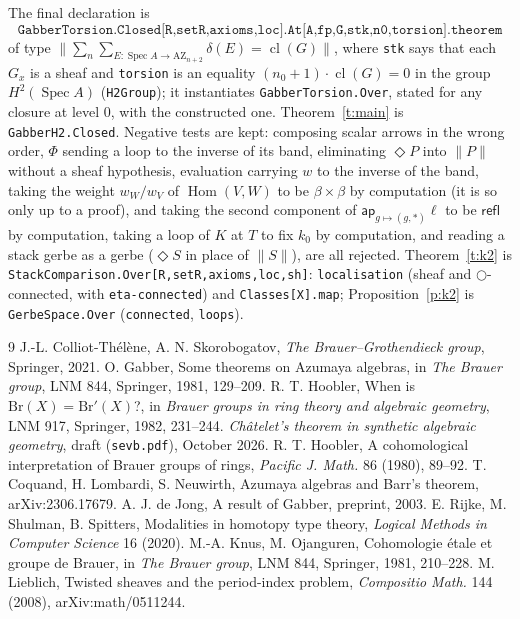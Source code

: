 \documentclass[11pt]{amsart}
\theoremstyle{definition}
\theoremstyle{remark}
\newcommand{\Spec}{\operatorname{Spec}}
\newcommand{\Hom}{\operatorname{Hom}}
\newcommand{\cl}{\operatorname{cl}}
\newcommand{\close}{\Diamond}
\newcommand{\tr}[1]{\|#1\|}
\newcommand{\code}[1]{\texttt{#1}}
\newcommand{\ap}{\mathsf{ap}}
\begin{document}
\smallskip
The final declaration is
\[\code{GabberTorsion.Closed[R,setR,axioms,loc].At[A,fp,G,stk,n0,torsion].theorem}\]
of type $\tr{\sum_n\sum_{E:\Spec A\to\mathrm{AZ}_{n+2}}\delta(E)=\cl(G)}$,
where \code{stk} says that each $G_x$ is a sheaf and \code{torsion} is an
equality $(n_0+1)\cdot\cl(G)=0$ in the group $H^2(\Spec A)$
(\code{H2Group}); it instantiates \code{GabberTorsion.Over}, stated for any
closure at level $0$, with the constructed one. Theorem~\ref{t:main} is
\code{GabberH2.Closed}. Negative tests are kept: composing scalar arrows in
the wrong order, $\Phi$ sending a loop to the inverse of its band,
eliminating $\close P$ into $\tr P$ without a sheaf hypothesis, evaluation
carrying $w$ to the inverse of the band, taking the weight
$w_W/w_V$ of $\Hom(V,W)$ to be $\beta\times\beta$ by computation (it is
so only up to a proof), and taking the second component of
$\ap_{g\mapsto(g,\ast)}\ell$ to be $\mathsf{refl}$ by computation, taking a
loop of $K$ at $T$ to fix $k_0$ by computation, and reading a stack gerbe
as a gerbe ($\close S$ in place of $\tr S$), are all rejected. Theorem~\ref{t:k2}
is \code{StackComparison.Over[R,setR,axioms,loc,sh]}: \code{localisation}
(sheaf and $\bigcirc$-connected, with \code{eta-connected}) and
\code{Classes[X].map}; Proposition~\ref{p:k2} is \code{GerbeSpace.Over}
(\code{connected}, \code{loops}).

\begin{thebibliography}{9}
 J.-L. Colliot-Th\'el\`ene, A. N. Skorobogatov, \emph{The
  Brauer--Grothendieck group}, Springer, 2021.
 O. Gabber, Some theorems on Azumaya algebras, in \emph{The
  Brauer group}, LNM 844, Springer, 1981, 129--209.
 R. T. Hoobler, When is $\mathrm{Br}(X)=\mathrm{Br}'(X)$?, in
  \emph{Brauer groups in ring theory and algebraic geometry}, LNM 917,
  Springer, 1982, 231--244.
 \emph{Ch\^atelet's theorem in synthetic algebraic
  geometry}, draft (\code{sevb.pdf}), October 2026.
 R. T. Hoobler, A cohomological interpretation of Brauer
  groups of rings, \emph{Pacific J. Math.} 86 (1980), 89--92.
 T. Coquand, H. Lombardi, S. Neuwirth, Azumaya algebras and
  Barr's theorem, arXiv:2306.17679.
 A. J. de Jong, A result of Gabber, preprint, 2003.
 E. Rijke, M. Shulman, B. Spitters, Modalities in homotopy type
  theory, \emph{Logical Methods in Computer Science} 16 (2020).
 M.-A. Knus, M. Ojanguren, Cohomologie \'etale et groupe de
  Brauer, in \emph{The Brauer group}, LNM 844, Springer, 1981, 210--228.
 M. Lieblich, Twisted sheaves and the period-index problem,
  \emph{Compositio Math.} 144 (2008), arXiv:math/0511244.
\end{thebibliography}
\end{document}
